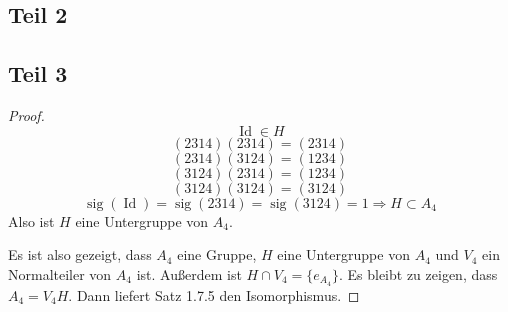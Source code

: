 \documentclass[10pt,a4paper]{article}
\DeclareMathOperator{\Id}{Id}
\DeclareMathOperator{\sig}{sig}
\begin{document}
\subsection{Teil 2}

\subsection{Teil 3}

\begin{proof}
  \begin{equation}
    \Id \in H
  \end{equation}
  \begin{equation}
    (2314)(2314) = (2314)
  \end{equation}
  \begin{equation}
    (2314)(3124) = (1234)
  \end{equation}
  \begin{equation}
    (3124)(2314) = (1234)
  \end{equation}
  \begin{equation}
    (3124)(3124) = (3124)
  \end{equation}
  \begin{equation}
    \sig(\Id) = \sig(2314) = \sig(3124) = 1 \Rightarrow H \subset A_{4}
  \end{equation}
  Also ist $H$ eine Untergruppe von $A_{4}$.

  Es ist also gezeigt, dass $A_{4}$ eine Gruppe, $H$ eine Untergruppe von $A_{4}$ und $V_{4}$ ein Normalteiler von $A_{4}$ ist.
  Außerdem ist $H \cap V_{4} = \{ e_{A_{4}} \}$.
  Es bleibt zu zeigen, dass $A_{4} = V_{4}H$.
  Dann liefert Satz 1.7.5 den Isomorphismus.


\end{proof}
\end{document}
